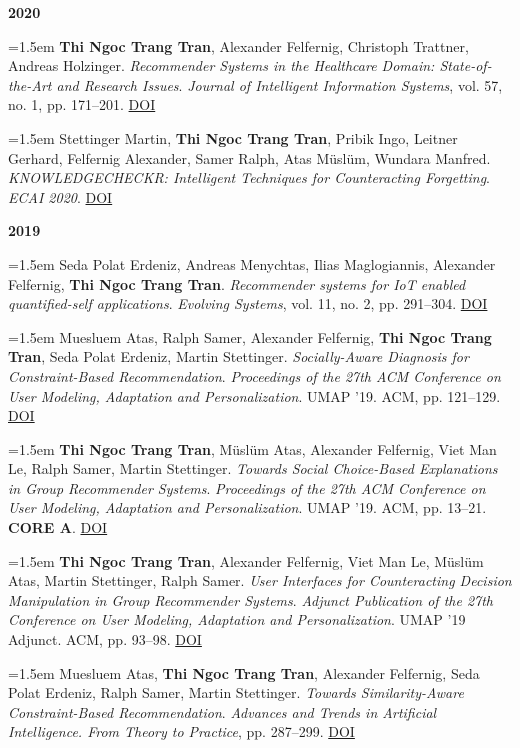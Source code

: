 \documentclass[11pt,a4paper]{article}
\newcommand{\pub}[1]{%
  \par\noindent\hangindent=1.5em\hangafter=1 #1\par\vspace{0.5ex}}
\newcommand{\pubyear}[1]{\vspace{0.7ex}\par\noindent\textbf{#1}\par\vspace{0.2ex}}
\begin{document}
\pubyear{2020}
\pub{\textbf{Thi Ngoc Trang Tran}, Alexander Felfernig, Christoph Trattner, Andreas Holzinger. \textit{Recommender Systems in the Healthcare Domain: State-of-the-Art and Research Issues}. \textit{Journal of Intelligent Information Systems}, vol. 57, no. 1, pp. 171–201. \href{https://doi.org/10.1007/s10844-020-00633-6}{DOI}}
\pub{Stettinger Martin, \textbf{Thi Ngoc Trang Tran}, Pribik Ingo, Leitner Gerhard, Felfernig Alexander, Samer Ralph, Atas Müslüm, Wundara Manfred. \textit{KNOWLEDGECHECKR: Intelligent Techniques for Counteracting Forgetting}. \textit{ECAI 2020}. \href{https://doi.org/10.3233/faia200479}{DOI}}

\pubyear{2019}
\pub{Seda Polat Erdeniz, Andreas Menychtas, Ilias Maglogiannis, Alexander Felfernig, \textbf{Thi Ngoc Trang Tran}. \textit{Recommender systems for IoT enabled quantified-self applications}. \textit{Evolving Systems}, vol. 11, no. 2, pp. 291–304. \href{https://doi.org/10.1007/s12530-019-09302-8}{DOI}}
\pub{Muesluem Atas, Ralph Samer, Alexander Felfernig, \textbf{Thi Ngoc Trang Tran}, Seda Polat Erdeniz, Martin Stettinger. \textit{Socially-Aware Diagnosis for Constraint-Based Recommendation}. \textit{Proceedings of the 27th ACM Conference on User Modeling, Adaptation and Personalization}. UMAP ’19. ACM, pp. 121–129. \href{https://doi.org/10.1145/3320435.3320436}{DOI}}
\pub{\textbf{Thi Ngoc Trang Tran}, Müslüm Atas, Alexander Felfernig, Viet Man Le, Ralph Samer, Martin Stettinger. \textit{Towards Social Choice-Based Explanations in Group Recommender Systems}. \textit{Proceedings of the 27th ACM Conference on User Modeling, Adaptation and Personalization}. UMAP ’19. ACM, pp. 13–21. \textbf{CORE A}. \href{https://doi.org/10.1145/3320435.3320437}{DOI}}
\pub{\textbf{Thi Ngoc Trang Tran}, Alexander Felfernig, Viet Man Le, Müslüm Atas, Martin Stettinger, Ralph Samer. \textit{User Interfaces for Counteracting Decision Manipulation in Group Recommender Systems}. \textit{Adjunct Publication of the 27th Conference on User Modeling, Adaptation and Personalization}. UMAP ’19 Adjunct. ACM, pp. 93–98. \href{https://doi.org/10.1145/3314183.3324977}{DOI}}
\pub{Muesluem Atas, \textbf{Thi Ngoc Trang Tran}, Alexander Felfernig, Seda Polat Erdeniz, Ralph Samer, Martin Stettinger. \textit{Towards Similarity-Aware Constraint-Based Recommendation}. \textit{Advances and Trends in Artificial Intelligence. From Theory to Practice}, pp. 287–299. \href{https://doi.org/10.1007/978-3-030-22999-3_26}{DOI}}
\end{document}
